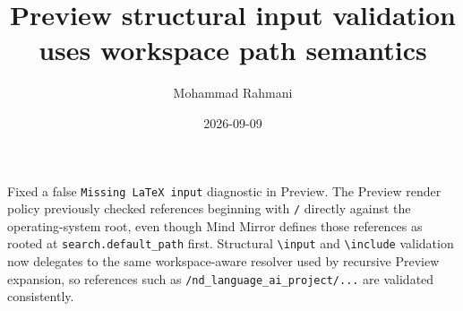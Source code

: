 \documentclass[a4paper]{article}
\title{Preview structural input validation uses workspace path semantics}
\date{2026-09-09}
\author{Mohammad Rahmani}
\begin{document}
   \maketitle

   \begin{preview}
      Fixed a false \texttt{Missing LaTeX input} diagnostic in Preview. The
      Preview render policy previously checked references beginning with
      \texttt{/} directly against the operating-system root, even though Mind
      Mirror defines those references as rooted at \texttt{search.default\_path}
      first. Structural \texttt{\textbackslash input} and
      \texttt{\textbackslash include} validation now delegates to the same
      workspace-aware resolver used by recursive Preview expansion, so
      references such as \texttt{/nd\_language\_ai\_project/...} are validated
      consistently.
   \end{preview}
\end{document}
